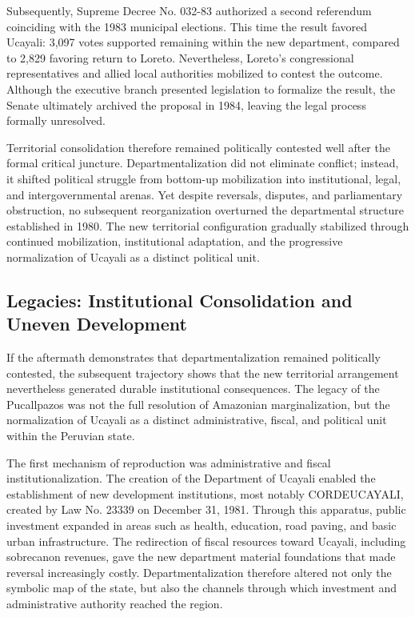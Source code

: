 \documentclass[12pt]{article}
\begin{document}
Subsequently, Supreme Decree No. 032-83 authorized a second referendum coinciding with the 1983 municipal elections. This time the result favored Ucayali: 3,097 votes supported remaining within the new department, compared to 2,829 favoring return to Loreto. Nevertheless, Loreto's congressional representatives and allied local authorities mobilized to contest the outcome. Although the executive branch presented legislation to formalize the result, the Senate ultimately archived the proposal in 1984, leaving the legal process formally unresolved.

Territorial consolidation therefore remained politically contested well after the formal critical juncture. Departmentalization did not eliminate conflict; instead, it shifted political struggle from bottom-up mobilization into institutional, legal, and intergovernmental arenas. Yet despite reversals, disputes, and parliamentary obstruction, no subsequent reorganization overturned the departmental structure established in 1980. The new territorial configuration gradually stabilized through continued mobilization, institutional adaptation, and the progressive normalization of Ucayali as a distinct political unit.


\subsection{Legacies: Institutional Consolidation and Uneven Development}

If the aftermath demonstrates that departmentalization remained politically contested, the subsequent trajectory shows that the new territorial arrangement nevertheless generated durable institutional consequences. The legacy of the Pucallpazos was not the full resolution of Amazonian marginalization, but the normalization of Ucayali as a distinct administrative, fiscal, and political unit within the Peruvian state.

The first mechanism of reproduction was administrative and fiscal institutionalization. The creation of the Department of Ucayali enabled the establishment of new development institutions, most notably CORDEUCAYALI, created by Law No. 23339 on December 31, 1981. Through this apparatus, public investment expanded in areas such as health, education, road paving, and basic urban infrastructure. The redirection of fiscal resources toward Ucayali, including sobrecanon revenues, gave the new department material foundations that made reversal increasingly costly. Departmentalization therefore altered not only the symbolic map of the state, but also the channels through which investment and administrative authority reached the region.
\end{document}
